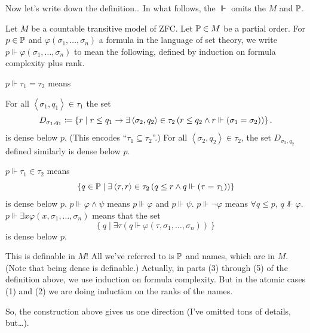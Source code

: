 Now let's write down the definition\dots
In what follows, the $\Vdash$ omits the $M$ and $\mathbb P$.
\begin{definition}
	Let $M$ be a countable transitive model of ZFC.
	Let $\mathbb P \in M$ be a partial order.
	For $p \in \mathbb P$ and $\varphi(\sigma_1, \dots, \sigma_n)$
	a formula in the language of set theory,
	we write $p \Vdash \varphi(\sigma_1, \dots, \sigma_n)$
	to mean the following, defined by induction on formula complexity plus rank.
	\begin{enumerate}[(1)]
		\ii $p \Vdash \tau_1 = \tau_2$ means
		\begin{enumerate}[(i)]
			\ii For all $\left<\sigma_1, q_1\right> \in \tau_1$ the set
			\[ D_{\sigma_1, q_1}
				\coloneqq
				\left\{ r \mid
				r \le q_1 \rightarrow \exists \left<\sigma_2, q_2\right> \in \tau_2 \left( r \le q_2 \land r \Vdash (\sigma_1 = \sigma_2) \right)\right\}.
			\]
			is dense below $p$.
			(This encodes ``$\tau_1 \subseteq \tau_2$''.)
			\ii For all $\left<\sigma_2, q_2\right> \in \tau_2$,
			the set $D_{\sigma_2, q_2}$ defined similarly is dense below $p$.
		\end{enumerate}
		\ii $p \Vdash \tau_1 \in \tau_2$ means
		\[
		\left\{ q \in \mathbb P
		\mid \exists \left<\tau, r\right> \in \tau_2
		\left( q \le r \land q \Vdash(\tau=\tau_1) \right)
		\right\} \]
		is dense below $p$.
		\ii $p \Vdash \varphi \land \psi$ means $p \Vdash \varphi$ and $p \Vdash \psi$.
		\ii $p \Vdash \neg \varphi$ means $\forall q \le p$, $q \not\Vdash \varphi$.
		\ii $p \Vdash \exists x \varphi(x, \sigma_1, \dots, \sigma_n)$ means that the set
		\[
			\left\{ q \mid \exists \tau \left( q \Vdash
				\varphi(\tau, \sigma_1, \dots, \sigma_n ) \right)
			\right\}
		\]
		is dense below $p$.
	\end{enumerate}
\end{definition}
This is definable in $M$!
All we've referred to is $\mathbb P$ and names, which are in $M$.
(Note that being dense is definable.)
Actually, in parts (3) through (5) of the definition above,
we use induction on formula complexity.
But in the atomic cases (1) and (2) we are doing induction on the ranks of the names.

So, the construction above gives us one direction (I've omitted tons of details, but\dots).

